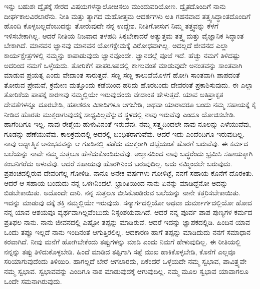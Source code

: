 ಇನ್ನು ಬಹುಶಃ ದ್ವೈತಕ್ಕೆ ಸೇರದ ವಿಷಯಗಳನ್ನಾಲೋಚಿಸಲು ಮುಂದುವರಿಯೋಣ. ದ್ವೈತದೊಂದಿಗೆ ನಾನು ದೀರ್ಘಕಾಲವಿರಲಾರೆನು. ನೀತಿ ಮತ್ತು ತ್ಯಾಗದ ಮಹೋತ್ತಮ ಆದರ್ಶಗಳು ಅತಿ ಗಹನವಾದ ತತ್ತ್ವಸಿದ್ಧಾಂತದೊಂದಿಗೆ ಹೊಂದಿ ಕೊಳ್ಳಬಲ್ಲದೆಂಬುದನ್ನು ತೋರುವುದೇ ನನ್ನ ಉದ್ದೇಶ. ನೀತಿಗೋಸುಗ ನಿಮ್ಮ ತತ್ತ್ವವನ್ನು ಕೆಳಗೆ ಇಳಿಸಬೇಕಾಗಿಲ್ಲ. ಆದರೆ ನೀತಿಯ ನಿಜವಾದ ತಳಹದಿ ಸಿಕ್ಕಬೇಕಾದರೆ ಅತ್ಯುತ್ತಮ ತತ್ತ್ವ ಮತ್ತು ವೈಜ್ಞಾನಿಕ ಸಿದ್ಧಾಂತ ಬೇಕಾಗಿದೆ. ಮಾನವನ ಜ್ಞಾನವು ಮಾನವನ ಯೋಗಕ್ಷೇಮಕ್ಕೆ ವಿರೋಧವಾಗಿಲ್ಲ. ಅದಲ್ಲದೆ ಜೀವನದ ಎಲ್ಲಾ ಕಾರ್ಯಕ್ಷೇತ್ರಗಳಲ್ಲಿ ನಮ್ಮನ್ನು ಕಾಪಾಡುವುದು ಜ್ಞಾನವೊಂದೇ. ಜ್ಞಾನದಲ್ಲೆ ಪೂಜೆ ಇದೆ. ಹೆಚ್ಚು ನಮಗೆ ತಿಳಿದಷ್ಟು ಅದರಿಂದ ನಮಗೆ ಒಳ್ಳೆಯದು. ತೋರಿಕೆಗೆ ಪಾಪರೂಪದಲ್ಲಿ ಕಾಣುವಂತೆ ಮಾಡುವುದೇ ಅನಂತವನ್ನು ಸಾಂತವಾಗಿ ಮಾಡುವ ಪ್ರಯತ್ನ ಎಂದು ವೇದಾಂತ ಸಾರುತ್ತದೆ. ಸಣ್ಣ ಸಣ್ಣ ಕಾಲುವೆಯೊಳಗೆ ಹೋಗಿ ಸಾಂತವಾಗಿ ಪಾಪದಂತೆ ತೋರುವ ಪ್ರೇಮವೆ, ಕ್ರಮೇಣ ಮತ್ತೊಂದು ಕಡೆಯಿಂದ ಹರಿದು ಹೊರಬಂದು ದೇವರಂತೆ ಪ್ರಕಾಶಿಸುವುದು. ಈ ಎಲ್ಲಾ ತೋರಿಕೆಯ ಪಾಪಕ್ಕೆ ಕಾರಣವು ನಮ್ಮಲ್ಲಿಯೇ ಇರುವುದೆಂದು ವೇದಾಂತ ಹೇಳುತ್ತದೆ. ಯಾವ ಅತಿಪ್ರಾಕೃತ ದೇವತೆಗಳನ್ನೂ ದೂರಬೇಡಿ, ಹತಾಶರೂ ವಿಶಾದಿಗಳೂ ಆಗಬೇಡಿ, ಅಥವಾ ಯಾರಾದರೂ ಬಂದು ನಮ್ಮ ಸಹಾಯಕ್ಕೆ ಕೈ ನೀಡಿದ ಹೊರತು ಮುಕ್ತರಾಗುವುದಕ್ಕೆ ಸಾಧ್ಯವಿಲ್ಲವೆನ್ನುವ ಸ್ಥಳದಲ್ಲಿ ನಾವು ಇರುವೆವು ಎಂದೂ ಯೋಚಿಸಬೇಡಿ. ಹಾಗೆಂದಿಗೂ ಇಲ್ಲ. ನಾವು ರೇಶ್ಮೆಯ ಹುಳುವಿನಂತೆ ಇರುವೆವು. ನಮ್ಮ ಸತ್ತ್ವದಿಂದಲೇ ನಾವು ನೂಲನ್ನು ಎಳೆಯುವೆವು, ಗೂಡನ್ನು ಹೆಣೆಯುವೆವು. ಕಾಲಕ್ರಮದಲ್ಲಿ ಅದರಲ್ಲಿ ಬಂಧಿತರಾಗುವೆವು. ಆದರೆ ಇದು ಎಂದೆಂದಿಗೂ ಇರುವುದಿಲ್ಲ. ನಾವು ಆಧ್ಯಾತ್ಮಿಕ ಅನುಭವವನ್ನು ಆ ಗೂಡಿನಲ್ಲಿ ಪಡೆದು ಮುಕ್ತರಾಗಿ ಚಿಟ್ಟೆಯಂತೆ ಹೊರಗೆ ಬರುವೆವು. ಈ ಕರ್ಮದ ಬಲೆಯನ್ನು ನಾವೇ ನಮ್ಮ ಸುತ್ತಲೂ ಹೆಣೆದುಕೊಂಡಿರುವೆವು. ಅಜ್ಞಾನದಿಂದ ನಾವು ಬದ್ಧರೆಂದು ಭ್ರಮಿಸಿ ಸಹಾಯಕ್ಕಾಗಿ ಕಂಬನಿಗರೆದು ಅಳುವೆವು. ಆದರೆ ಸಹಾಯವು ಹೊರಗಿನಿಂದ ಬರುವುದಿಲ್ಲ. ಅದು ನಮ್ಮಿಂದಲೇ ಬರುವುದು. ಪ್ರಪಂಚದಲ್ಲಿರುವ ದೇವರಿಗೆಲ್ಲ ಗೋಳಿಡಿ. ನಾನೂ ಅನೇಕ ವರ್ಷಗಳು ಗೋಳಿಟ್ಟೆ, ನನಗೆ ಸಹಾಯ ಕೊನೆಗೆ ದೊರಕಿತು. ಆದರೆ ಆ ಸಹಾಯ ಬಂದುದು ನನ್ನ ಒಳಗಿನಿಂದಲೆ. ಭ್ರಾಂತಿಯಿಂದ ನಾನು ಏನನ್ನು ಮಾಡಿದ್ದೆನೋ ಅದನ್ನು ಬಿಡಬೇಕಾಯಿತು. ಅದೊಂದೇ ದಾರಿ. ನನ್ನ ಸುತ್ತಲೂ ಬೀಸಿಕೊಂಡಿರುವ ಬಲೆಯನ್ನು ನಾನೇ ಕತ್ತರಿಸಬೇಕಾಯಿತು. ಇದನ್ನು ಮಾಡುವು ದಕ್ಕೆ ಶಕ್ತಿ ನಮ್ಮಲ್ಲಿಯೇ ಇರುವುದು. ಸನ್ಮಾರ್ಗದಲ್ಲಿಯೋ ಅಥವಾ ದುರ್ಮಾರ್ಗದಲ್ಲಿಯೋ ಹೋದ ನನ್ನ ಯಾವ ಆಶಯವೂ ವ್ಯರ್ಥವಾಗಿಲ್ಲವೆಂಬುದು ನಿಸ್ಸಂಶಯವಾಗಿದೆ. ಆದರೆ ನನ್ನ ಪೂರ್ವ ಪಾಪ ಪುಣ್ಯಗಳ ಕರ್ಮದ ಪ್ರತಿಫಲ ನಾನು. ನಾನು ಜೀವನದಲ್ಲಿ ಎಷ್ಟೋ ತಪ್ಪನ್ನು ಮಾಡಿರುವೆ. ಆದರೆ ಇದನ್ನು ಜ್ಞಾಪಕದಲ್ಲಿಡಿ. ಹಿಂದಿನ ಯಾವ ಒಂದು ತಪ್ಪೂ ಇಲ್ಲದೆ ನಾನು ಇಂದಿನಂತೆ ಆಗುತ್ತಿರಲಿಲ್ಲ. ಆದಕಾರಣ ಹಾಗೆ ತಪ್ಪನ್ನು ಮಾಡಿದುದು ನನಗೆ ಸಮಾಧಾನ ಕರವಾಗಿದೆ. ನೀವು ಮನೆಗೆ ಹೋಗಿಬೇಕೆಂದು ತಪ್ಪುಗಳನ್ನು ಮಾಡಿ ಎಂದು ನಿಮಗೆ ಹೇಳುವುದಿಲ್ಲ. ಈ ರೀತಿಯಲ್ಲಿ ನನ್ನನ್ನು ತಪ್ಪು ತಿಳಿದುಕೊಳ್ಳಬೇಡಿ. ಹಿಂದೆ ಮಾಡಿದ ತಪ್ಪಿಗಾಗಿ ಸಪ್ಪೆ ಮುಖ ಹಾಕಿಕೊಳ್ಳಬೇಡಿ, ಕೊನೆಗೆ ಎಲ್ಲವೂ ಸರಿಯಾಗುವುದೆಂದು ತಿಳಿಯಿರಿ. ಹಾಗಲ್ಲದೆ ಬೇರೆ ಆಗಲಾರದು, ಏಕೆಂದರೆ ಒಳ್ಳೆಯದೇ ನಮ್ಮ ಸ್ವಭಾವ, ಪಾವಿತ್ರ್ಯವೇ ನಮ್ಮ ಸ್ವಭಾವ. ಸ್ವಭಾವವನ್ನು ಎಂದಿಗೂ ನಾಶ ಮಾಡುವುದಕ್ಕೆ ಆಗುವುದಿಲ್ಲ. ನಮ್ಮ ಮೂಲ ಸ್ವಭಾವ ಯಾವಾಗಲೂ ಒಂದೇ ಸಮನಾಗಿರುವುದು. 

